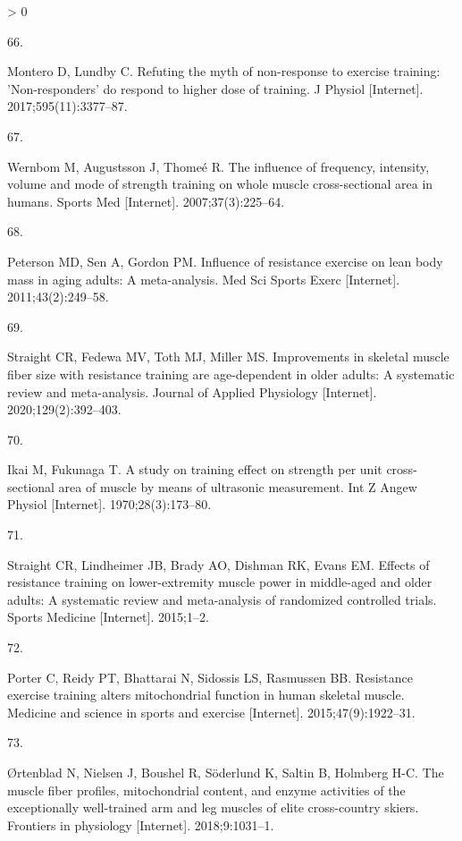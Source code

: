 \documentclass[twoside,10pt]{gihclass} %
\newlength{\cslhangindent}
\newlength{\csllabelwidth}
\newenvironment{CSLReferences}[3] %
 {%
  \setlength{\parindent}{0pt}
  \ifodd #1 \everypar{\setlength{\hangindent}{\cslhangindent}}\ignorespaces\fi
  \ifnum #2 > 0
  \setlength{\parskip}{#2\baselineskip}
  \fi
 }%
 {}
\newcommand{\CSLLeftMargin}[1]{\parbox[t]{\maxof{\widthof{#1}}{\csllabelwidth}}{#1}}
\newcommand{\CSLRightInline}[1]{\parbox[t]{\linewidth}{#1}}
\begin{document}
\begin{CSLReferences}{0}{0}
\leavevmode\hypertarget{ref-RN2699}{}%
\CSLLeftMargin{66. }
\CSLRightInline{Montero D, Lundby C. Refuting the myth of non-response to exercise training: 'Non-responders' do respond to higher dose of training. J Physiol {[}Internet{]}. 2017;595(11):3377--87. }

\leavevmode\hypertarget{ref-RN346}{}%
\CSLLeftMargin{67. }
\CSLRightInline{Wernbom M, Augustsson J, Thomeé R. The influence of frequency, intensity, volume and mode of strength training on whole muscle cross-sectional area in humans. Sports Med {[}Internet{]}. 2007;37(3):225--64. }

\leavevmode\hypertarget{ref-RN752}{}%
\CSLLeftMargin{68. }
\CSLRightInline{Peterson MD, Sen A, Gordon PM. Influence of resistance exercise on lean body mass in aging adults: A meta-analysis. Med Sci Sports Exerc {[}Internet{]}. 2011;43(2):249--58. }

\leavevmode\hypertarget{ref-RN2669}{}%
\CSLLeftMargin{69. }
\CSLRightInline{Straight CR, Fedewa MV, Toth MJ, Miller MS. Improvements in skeletal muscle fiber size with resistance training are age-dependent in older adults: A systematic review and meta-analysis. Journal of Applied Physiology {[}Internet{]}. 2020;129(2):392--403. }

\leavevmode\hypertarget{ref-RN2629}{}%
\CSLLeftMargin{70. }
\CSLRightInline{Ikai M, Fukunaga T. A study on training effect on strength per unit cross-sectional area of muscle by means of ultrasonic measurement. Int Z Angew Physiol {[}Internet{]}. 1970;28(3):173--80. }

\leavevmode\hypertarget{ref-RN1710}{}%
\CSLLeftMargin{71. }
\CSLRightInline{Straight CR, Lindheimer JB, Brady AO, Dishman RK, Evans EM. Effects of resistance training on lower-extremity muscle power in middle-aged and older adults: A systematic review and meta-analysis of randomized controlled trials. Sports Medicine {[}Internet{]}. 2015;1--2. }

\leavevmode\hypertarget{ref-RN2608}{}%
\CSLLeftMargin{72. }
\CSLRightInline{Porter C, Reidy PT, Bhattarai N, Sidossis LS, Rasmussen BB. Resistance exercise training alters mitochondrial function in human skeletal muscle. Medicine and science in sports and exercise {[}Internet{]}. 2015;47(9):1922--31. }

\leavevmode\hypertarget{ref-RN2615}{}%
\CSLLeftMargin{73. }
\CSLRightInline{Ørtenblad N, Nielsen J, Boushel R, Söderlund K, Saltin B, Holmberg H-C. The muscle fiber profiles, mitochondrial content, and enzyme activities of the exceptionally well-trained arm and leg muscles of elite cross-country skiers. Frontiers in physiology {[}Internet{]}. 2018;9:1031--1. }


\end{CSLReferences}
\end{document}
